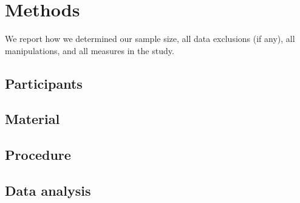 \documentclass[man]{apa6}
\begin{document}
\hypertarget{methods}{%
\section{Methods}\label{methods}}

We report how we determined our sample size, all data exclusions (if any), all manipulations, and all measures in the study.

\hypertarget{participants}{%
\subsection{Participants}\label{participants}}

\hypertarget{material}{%
\subsection{Material}\label{material}}

\hypertarget{procedure}{%
\subsection{Procedure}\label{procedure}}

\hypertarget{data-analysis}{%
\subsection{Data analysis}\label{data-analysis}}
\end{document}
